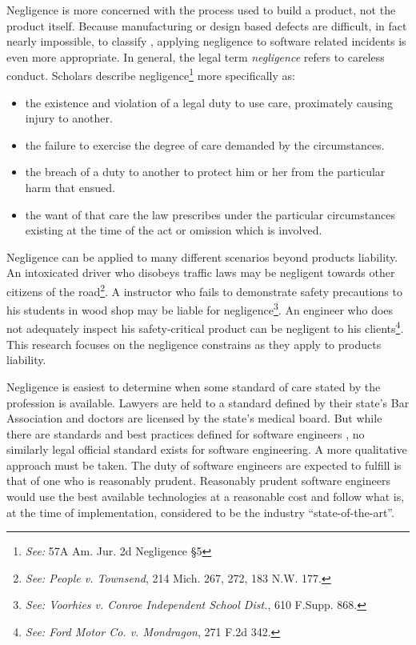 \documentclass[12pt]{report}
\begin{document}
Negligence is more concerned with the process used to build a product, not the product itself. Because manufacturing or design based defects are difficult, in fact nearly impossible, to classify \cite{Turner99}, applying negligence to software related incidents is even more appropriate. In general, the legal term \textit{negligence} refers to careless conduct. Scholars describe negligence\footnote{\textit{See:} 57A Am. Jur. 2d Negligence \S 5} more specifically as:\singlespace
\begin{itemize}
 \item the existence and violation of a legal duty to use care, proximately 
 causing injury to another.
 \item the failure to exercise the degree of care demanded by the circumstances.
 \item the breach of a duty to another to protect him or her from the particular
 harm that ensued.
 \item the want of that care the law prescribes under the particular
 circumstances existing at the time of the act or omission which is involved.
\end{itemize}\doublespace
Negligence can be applied to many different scenarios beyond products liability. An intoxicated driver who disobeys traffic laws may be negligent towards other citizens of the road\footnote{\textit{See: People v. Townsend}, 214 Mich. 267, 272, 183 N.W. 177.}. A instructor who fails to demonstrate safety precautions to his students in wood shop may be liable for negligence\footnote{\textit{See: Voorhies v. Conroe Independent School Dist.}, 610 F.Supp. 868.}. An engineer who does not adequately inspect his safety-critical product can be negligent to his clients\footnote{\textit{See: Ford Motor Co. v. Mondragon}, 271 F.2d 342.}. This research focuses on the negligence constrains as they apply to products liability.

Negligence is easiest to determine when some standard of care stated by the profession is available. Lawyers are held to a standard defined by their state's Bar Association and doctors are licensed by the state's medical board. But while there are standards and best practices defined for software engineers \cite{FAKE}, no similarly legal official standard exists for software engineering. A more qualitative approach must be taken. The duty of software engineers are expected to fulfill is that of one who is reasonably prudent. Reasonably prudent software engineers would use the best available technologies at a reasonable cost and follow what is, at the time of implementation, considered to be the industry ``state-of-the-art''.
\end{document}
